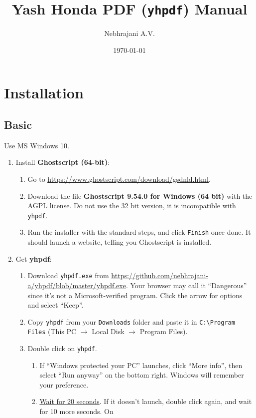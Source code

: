 \documentclass[9pt]{report}
\author{Nebhrajani A.V.}
\date{\today}
\title{Yash Honda PDF (\texttt{yhpdf}) Manual}
\begin{document}
\maketitle
\tableofcontents


\chapter{Installation}
\label{sec:org82b982e}

\section{Basic}
\label{sec:org9fcb344}
Use MS Windows 10.

\begin{enumerate}
\item Install \textbf{Ghostscript (64-bit)}:
\begin{enumerate}
\item Go to \uline{\url{https://www.ghostscript.com/download/gsdnld.html}}.
\item Download the file \textbf{Ghostscript 9.54.0 for Windows (64 bit)} with
the AGPL license. \uline{Do not use the 32 bit
version, it is incompatible with \texttt{yhpdf}.}
\item Run the installer with the standard steps, and click \texttt{Finish}
once done. It should launch a website, telling you Ghostscript
is installed.
\end{enumerate}
\item Get \textbf{yhpdf}:
\begin{enumerate}
\item Download \texttt{yhpdf.exe} from
\uline{\url{https://github.com/nebhrajani-a/yhpdf/blob/master/yhpdf.exe}}.
Your browser may call it ``Dangerous'' since it's not a
Microsoft-verified program. Click the arrow for options and
select ``Keep''.
\item Copy \texttt{yhpdf} from your \texttt{Downloads} folder and paste it in
\texttt{C:\textbackslash{}Program Files} (This PC \(\rightarrow\) Local Disk
\(\rightarrow\) Program Files).
\item Double click on \texttt{yhpdf}.
\begin{enumerate}
\item If ``Windows protected your PC'' launches, click ``More
info'', then select ``Run anyway'' on the bottom right.
Windows will remember your preference.
\item \uline{Wait for 20 seconds}. If it doesn't
launch, double click again, and wait for 10 more seconds. On

\end{enumerate}
\end{enumerate}
\end{enumerate}
\end{document}

